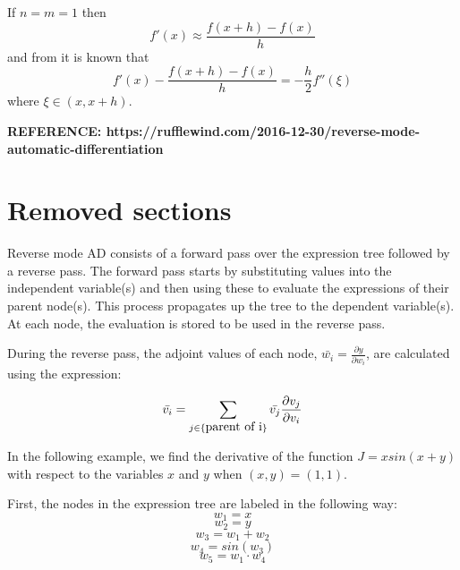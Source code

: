 \documentclass{article}
\begin{document}
If $n=m=1$ then
\begin{equation*}
    f'(x) \approx \frac{f(x+h)-f(x)}{h}
\end{equation*}
and from \cite{quarteroni} it is known that
\begin{equation*}
    f'(x) - \frac{f(x+h)-f(x)}{h} = - \frac{h}{2} f''(\xi)
\end{equation*}
where $\xi \in (x, x+h)$.

\textbf{REFERENCE: https://rufflewind.com/2016-12-30/reverse-mode-automatic-differentiation}



\section{Removed sections}


Reverse mode AD consists of a forward pass over the expression tree followed by a reverse pass. The forward pass starts by substituting values into the independent variable(s) and then using these to evaluate the expressions of their parent node(s). This process propagates up the tree to the dependent variable(s). At each node, the evaluation is stored to be used in the reverse pass.

During the reverse pass, the adjoint values of each node, $\bar{w_i} = \frac{\partial{y}}{\partial{w_i}}$, are calculated using the expression:

\begin{equation}
\Bar{v_i} = \sum_{j\in\{\mbox{parent of i}\}} \Bar{v_j}\frac{\partial{v_j}}{\partial{v_i}}
\end{equation}

In the following example, we find the derivative of the function $J = xsin(x+y)$ with respect to the variables $x$ and $y$ when $(x, y) = (1, 1)$.

First, the nodes in the expression tree are labeled in the following way:
\begin{equation}
w_1 = x
\end{equation}
\begin{equation}
w_2 = y
\end{equation}
\begin{equation}
w_3 = w_1 + w_2
\end{equation}
\begin{equation}
w_4 = sin(w_3)
\end{equation}
\begin{equation}
w_5 = w_1 \cdot w_4
\end{equation}
\\\\
\end{document}
